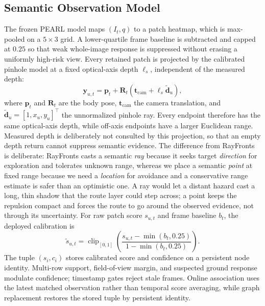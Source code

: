 \documentclass[letterpaper,10pt,conference]{ieeeconf}
\newcommand{\vect}[1]{\boldsymbol{#1}}
\newcommand{\mat}[1]{\mathbf{#1}}
\begin{document}
\subsection{Semantic Observation Model}
The frozen PEARL model \cite{pearl} maps $(I_t,q)$ to a patch heatmap, which
is max-pooled on a $5\times3$ grid.  A lower-quartile frame baseline is
subtracted and capped at $0.25$ so that weak whole-image response is
suppressed without erasing a uniformly high-risk view.  Every retained patch
is projected by the calibrated pinhole model at a fixed optical-axis depth
$\ell_s$, independent of the measured depth:
\begin{equation}
 \vect{y}_{u,t}=\vect{p}_t+\mat{R}_t
 \left(\vect{t}_{\mathrm{cam}}+\ell_s\widetilde{\vect{d}}_u\right),
\label{eq:projection}
\end{equation}
where $\vect{p}_t$ and $\mat{R}_t$ are the body pose,
$\vect{t}_{\mathrm{cam}}$ the camera translation, and
$\widetilde{\vect{d}}_u=[1,x_u,y_u]^\top$ the unnormalized pinhole ray.
Every endpoint therefore has the same optical-axis depth, while off-axis
endpoints have a larger Euclidean range.  Measured depth is deliberately not
consulted by this projection, so that an empty depth return cannot suppress
semantic evidence.  The difference from RayFronts \cite{rayfronts} is
deliberate: RayFronts casts a semantic \emph{ray} because it seeks
target \emph{direction} for exploration and tolerates unknown range, whereas
we place a semantic \emph{point} at fixed range because we need a
\emph{location} for avoidance and a conservative range estimate is safer than
an optimistic one.  A ray would let a distant hazard cast a long, thin shadow
that the route layer could step across; a point keeps the repulsion compact
and forces the route to go around the observed evidence, not through its
uncertainty.
For raw patch score $s_{u,t}$ and frame baseline $b_t$, the deployed
calibration is
\begin{equation}
 \widetilde{s}_{u,t}=
 \operatorname{clip}_{[0,1]}
 \left(\frac{s_{u,t}-\min(b_t,0.25)}
 {1-\min(b_t,0.25)}\right).
\label{eq:calibration}
\end{equation}
The tuple $(s_i,c_i)$ stores calibrated score and confidence on a persistent
node identity.  Multi-row support, field-of-view margin, and suspected ground
response modulate confidence; timestamp gates reject stale frames.  Online
association uses the latest matched observation rather than temporal score
averaging, while graph replacement restores the stored tuple by persistent
identity.
\end{document}
